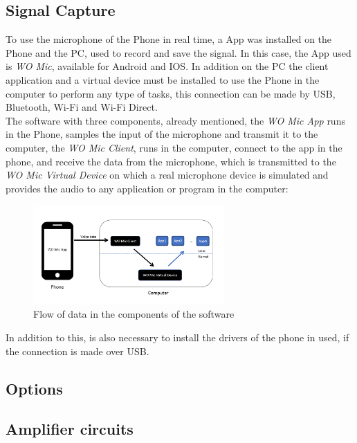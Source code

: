     \subsection*{Signal Capture}
    To use the microphone of the Phone in real time, a App was installed on the Phone and the PC, used to record and save the signal. In this case, the App used is \textit{WO Mic}, available for Android and IOS. In addition on the PC the client application and a virtual device must be installed to use the Phone in the computer to perform any type of tasks, this connection can be made by USB, Bluetooth, Wi-Fi and Wi-Fi Direct.\\
    The software with three components, already mentioned, the \textit{WO Mic App} runs in the Phone, samples the input of the microphone and transmit it to the computer, the \textit{WO Mic Client}, runs in the computer, connect to the app in the phone, and receive the data from the microphone, which is transmitted to the \textit{WO Mic Virtual Device} on which a real microphone device is simulated and provides the audio to any application or program in the computer\cite{WOMicFREE}:\\
    \begin{figure}[!htb]
        \centering
        \includegraphics[width=0.65\textwidth]{Chapters/3CHP/Images/WOMICDiag.png}
        \caption{Flow of data in the components of the software\cite{WOMicFREE}}
        \label{fig:diagramWOMIC}
    \end{figure}
    In addition to this, is also necessary to install the drivers of the phone in used, if the connection is made over USB.
    \subsection*{}  

\subsection{Options}
\subsection{Amplifier circuits}
